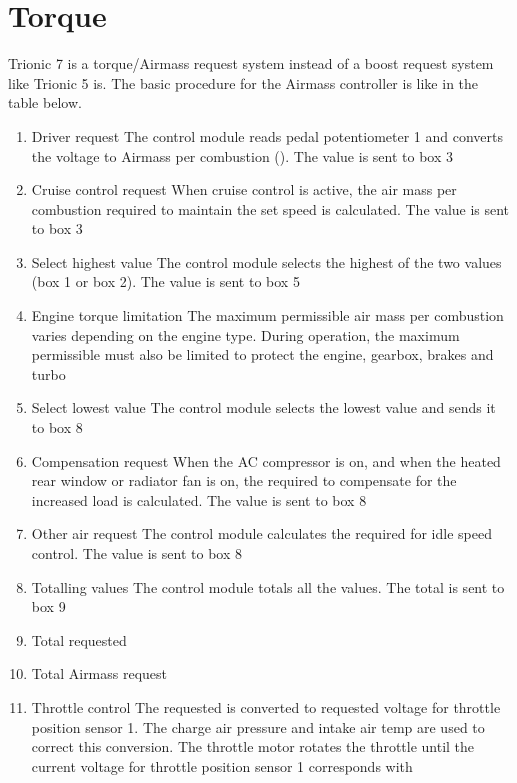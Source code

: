 \documentclass[11pt,a4paper]{book}
\begin{document}
\section{Torque}
Trionic 7 is a torque/Airmass request system instead of a boost request system like Trionic 5 is.
The basic procedure for the Airmass controller is like in the table below.
\begin{enumerate}
    \item  Driver request The control module reads pedal potentiometer 1 and
        converts the voltage to Airmass per combustion (\si{\mgc}). The value is
        sent to box 3
    \item Cruise control request When cruise control is active, the air mass per
        combustion required to maintain the set speed is calculated. The value
        is sent to box 3
    \item Select highest value The control module selects the highest of the two
        values (box 1 or box 2). The value is sent to box 5
    \item Engine torque limitation The maximum permissible air mass per
        combustion varies depending on the engine type. During operation, the
        maximum permissible \si{\mgc} must also be limited to protect the
        engine, gearbox, brakes and turbo
    \item Select lowest value The control module selects the lowest value and
        sends it to box 8
    \item Compensation request When the AC compressor is on, and when the heated
        rear window or radiator fan is on, the \si{\mgc} required to compensate
        for the increased load is calculated. The value is sent to box 8
    \item Other air request The control module calculates the \si{\mgc} required
        for idle speed control. The value is sent to box 8
    \item Totalling values The control module totals all the values. The total
        is sent to box 9
    \item Total requested \si{\mgc}
    \item Total Airmass request
    \item Throttle control The requested \si{\mgc} is converted to requested voltage for throttle
        position sensor 1. The charge air pressure and intake air temp are
        used to correct this conversion. The throttle motor rotates the throttle
        until the current voltage for throttle position sensor 1 corresponds with

\end{enumerate}
\end{document}
